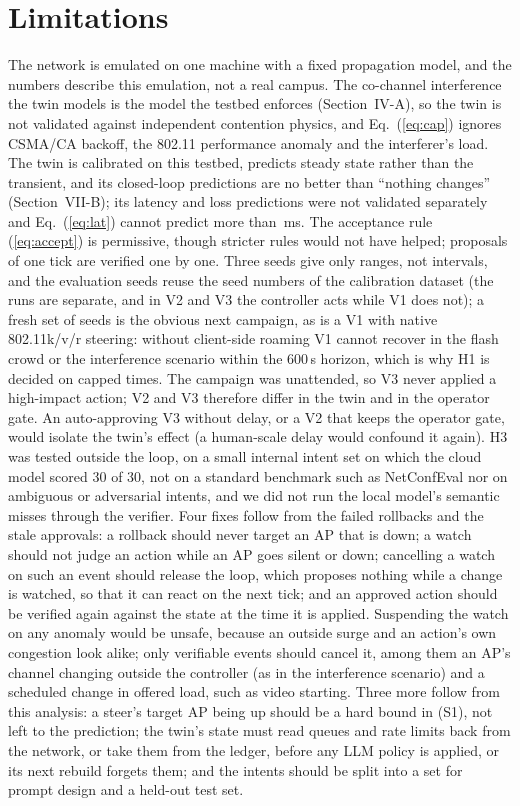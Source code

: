 \documentclass[conference]{IEEEtran}
\begin{document}
\section{Limitations}
The network is emulated on one machine with a fixed propagation model, and the numbers describe this emulation, not a real campus. The co-channel interference the twin models is the model the testbed enforces (Section~IV-A), so the twin is not validated against independent contention physics, and Eq.~(\ref{eq:cap}) ignores CSMA/CA backoff, the 802.11 performance anomaly and the interferer's load. The twin is calibrated on this testbed, predicts steady state rather than the transient, and its closed-loop predictions are no better than ``nothing changes'' (Section~VII-B); its latency and loss predictions were not validated separately and Eq.~(\ref{eq:lat}) cannot predict more than \CfgLatCap\,ms. The acceptance rule (\ref{eq:accept}) is permissive, though stricter rules would not have helped; proposals of one tick are verified one by one. Three seeds give only ranges, not intervals, and the evaluation seeds reuse the seed numbers of the calibration dataset (the runs are separate, and in V2 and V3 the controller acts while V1 does not); a fresh set of seeds is the obvious next campaign, as is a V1 with native 802.11k/v/r steering: without client-side roaming V1 cannot recover in the flash crowd or the interference scenario within the 600\,s horizon, which is why H1 is decided on capped times. The campaign was unattended, so V3 never applied a high-impact action; V2 and V3 therefore differ in the twin and in the operator gate. An auto-approving V3 without delay, or a V2 that keeps the operator gate, would isolate the twin's effect (a human-scale delay would confound it again). H3 was tested outside the loop, on a small internal intent set on which the cloud model scored 30 of 30, not on a standard benchmark such as NetConfEval nor on ambiguous or adversarial intents, and we did not run the local model's semantic misses through the verifier. Four fixes follow from the failed rollbacks and the stale approvals: a rollback should never target an AP that is down; a watch should not judge an action while an AP goes silent or down; cancelling a watch on such an event should release the loop, which proposes nothing while a change is watched, so that it can react on the next tick; and an approved action should be verified again against the state at the time it is applied. Suspending the watch on any anomaly would be unsafe, because an outside surge and an action's own congestion look alike; only verifiable events should cancel it, among them an AP's channel changing outside the controller (as in the interference scenario) and a scheduled change in offered load, such as video starting. Three more follow from this analysis: a steer's target AP being up should be a hard bound in (S1), not left to the prediction; the twin's state must read queues and rate limits back from the network, or take them from the ledger, before any LLM policy is applied, or its next rebuild forgets them; and the intents should be split into a set for prompt design and a held-out test set.
\end{document}
